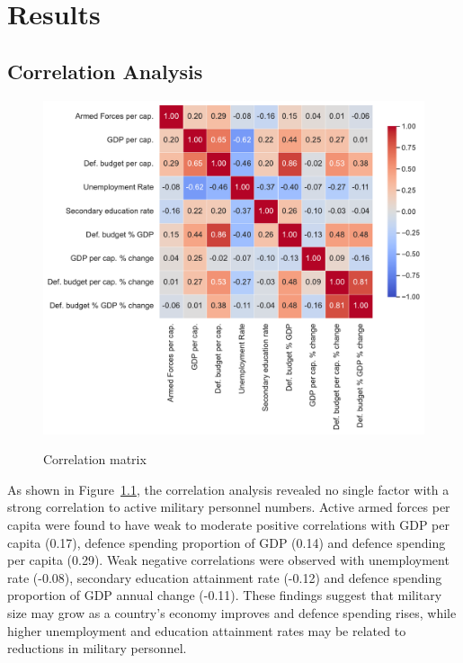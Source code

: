 \chapter{Results}

\section{Correlation Analysis}

\begin{figure}[htbp]
    \caption{Correlation matrix}
    \centering
    \includegraphics[width=1\textwidth]{images/correlation_heatmap.pdf}
    \label{fig:correlation_heatmap}
\end{figure}

As shown in Figure~\ref{fig:correlation_heatmap}, the correlation analysis revealed no single factor with a strong correlation to active military personnel numbers.
Active armed forces per capita were found to have weak to moderate positive correlations with GDP per 
capita (0.17), defence spending proportion of GDP (0.14) and defence spending per capita (0.29).
Weak negative correlations were observed with unemployment rate
(-0.08), secondary education attainment rate (-0.12) and defence spending proportion of GDP annual 
change (-0.11). These findings suggest that military size may grow as a country's economy improves 
and defence spending rises, while higher unemployment and education attainment rates may be related 
to reductions in military personnel.

